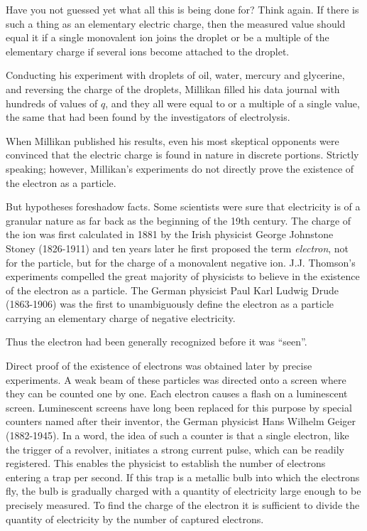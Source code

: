 Have you not guessed yet what all this is being done for? Think again. If there is such a thing as an elementary electric charge, then the measured value should equal it if a single monovalent ion joins the droplet or be a multiple of the elementary charge if several ions become attached to the droplet.


Conducting his experiment with droplets of oil, water, mercury and glycerine, and reversing the charge of the droplets, Millikan filled his data journal with hundreds of values of $q$, and they all were equal to or a multiple of a single value, the same that had been found by the investigators of electrolysis.

When Millikan published his results, even his most skeptical opponents were convinced that the electric charge is found in nature in discrete portions. Strictly speaking; however, Millikan's experiments do not directly prove the existence of the electron as a particle.

But hypotheses foreshadow facts. Some scientists were sure that electricity is of a granular nature as far back as the beginning of the 19th century. The charge of the ion was first calculated in 1881 by the Irish physicist George Johnstone Stoney (1826-1911) and ten years later he first proposed the term \emph{electron}, not for the particle, but for the charge of a monovalent negative ion. J.J. Thomson's experiments compelled the great majority of physicists to believe in the existence of the electron as a particle. The German physicist Paul Karl Ludwig Drude (1863-1906) was the first to unambiguously define the electron as a particle carrying an elementary charge of negative electricity.

Thus the electron had been generally recognized before it was ``seen''.

Direct proof of the existence of electrons was obtained later by precise experiments. A weak beam of these particles was directed onto a screen where they can be counted one by one. Each electron causes a flash on a luminescent screen. Luminescent screens have long been replaced for this purpose by special counters named after their inventor, the German physicist Hans Wilhelm Geiger (1882-1945). In a word, the idea of such a counter is that a single electron, like the trigger of a revolver, initiates a strong current pulse, which can be readily registered. This enables the physicist to establish the number of electrons entering a trap per second. If this trap is a metallic bulb into which the electrons fly, the bulb is gradually charged with a quantity of electricity large enough to be precisely measured. To find the charge of the electron it is sufficient to divide the quantity of electricity by the number of captured electrons.

